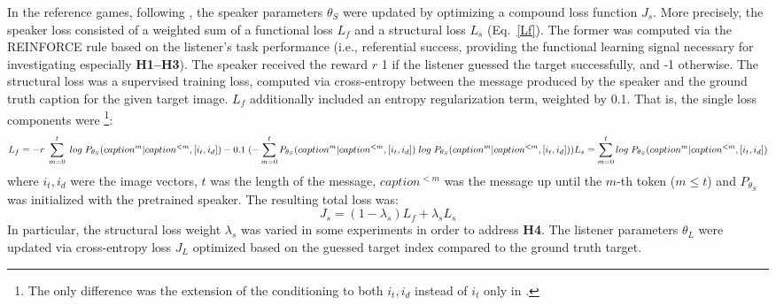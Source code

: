 In the reference games, following \cite{lazaridou2020multi}, the speaker parameters $\theta_S$ were updated by optimizing a compound loss function $J_s$. More precisely, the speaker loss consisted of a weighted sum of a functional loss $L_f$ and a structural loss $L_s$ (Eq.~\ref{Lf}). The former was computed via the REINFORCE rule based on the listener's task performance (i.e., referential success, providing the functional learning signal necessary for investigating especially \textbf{H1--H3}). The speaker received the reward $r$ 1 if the listener guessed the target successfully, and -1 otherwise. The structural loss was a supervised training loss, computed via cross-entropy between the message produced by the speaker and the ground truth caption for the given target image. $L_f$ additionally included an entropy regularization term, weighted by 0.1. That is, the single loss components were \parencite[following][]{lazaridou2020multi}\footnote{The only difference was the extension of the conditioning to both $i_t, i_d$ instead of $i_t$ only in \cite{lazaridou2020multi}.}:
\begin{dmath}
	\label{Lf}
L_f = -r \;\sum_{m=0}^{t}\; log \; P_{\theta_S}(caption^m|caption^{<m}, [i_t, i_d]) - 0.1 \; (- \sum_{m=0}^{t} P_{\theta_S}(caption^m|caption^{<m}, [i_t, i_d]) \; log \; P_{\theta_S}(caption^m|caption^{<m}, [i_t, i_d])) \\
{L_s = \sum_{m=0}^{t}log \; P_{\theta_S}(caption^m|caption^{<m}, [i_t, i_d])}
\end{dmath}
where $i_t, i_d$ were the image vectors, $t$ was the length of the message, $caption^{<m}$ was the message up until the $m$-th token ($m \leq t$) and $P_{\theta_S}$ was initialized with the pretrained speaker. The resulting total loss was:
\begin{equation}
J_s = (1-\lambda_s)L_f + \lambda_s L_s
\end{equation}
In particular, the structural loss weight $\lambda_s$ was varied in some experiments in order to address \textbf{H4}.
The listener parameters $\theta_L$ were updated via cross-entropy loss $J_L$ optimized based on the guessed target index compared to the ground truth target. 


